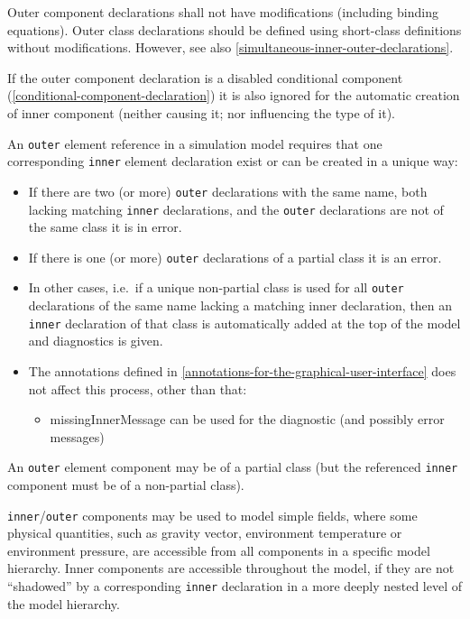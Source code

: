 Outer component declarations shall not have modifications (including binding equations).
Outer class declarations should be defined using short-class
definitions without modifications. However, see also \cref{simultaneous-inner-outer-declarations}.

If the outer component declaration is a disabled conditional component (\cref{conditional-component-declaration}) it is also ignored for the automatic creation of inner component (neither causing it; nor influencing the type of it).

An \lstinline!outer! element reference in a simulation model requires that one
corresponding \lstinline!inner! element declaration exist or can be created in a
unique way:
\begin{itemize}
\item
  If there are two (or more) \lstinline!outer! declarations with the same name, both
  lacking matching \lstinline!inner! declarations, and the \lstinline!outer! declarations are
  not of the same class it is in error.
\item
  If there is one (or more) \lstinline!outer! declarations of a partial class it is
  an error.
\item
  In other cases, i.e.\ if a unique non-partial class is used for all
  \lstinline!outer! declarations of the same name lacking a matching inner
  declaration, then an \lstinline!inner! declaration of that class is automatically
  added at the top of the model and diagnostics is given.
\item
  The annotations defined in \cref{annotations-for-the-graphical-user-interface} does not affect this process,
  other than that:

  \begin{itemize}
  \item
    missingInnerMessage can be used for the diagnostic (and possibly
    error messages)
  \end{itemize}
\end{itemize}

An \lstinline!outer! element component may be of a partial class (but the
referenced \lstinline!inner! component must be of a non-partial class).

\begin{nonnormative}
\lstinline!inner!/\lstinline!outer! components may be used to model simple fields, where some physical quantities, such as gravity vector, environment temperature or
environment pressure, are accessible from all components in a specific model hierarchy.  Inner components are accessible throughout the model, if they are not ``shadowed''
by a corresponding \lstinline!inner! declaration in a more deeply nested level of the model hierarchy.
\end{nonnormative}

